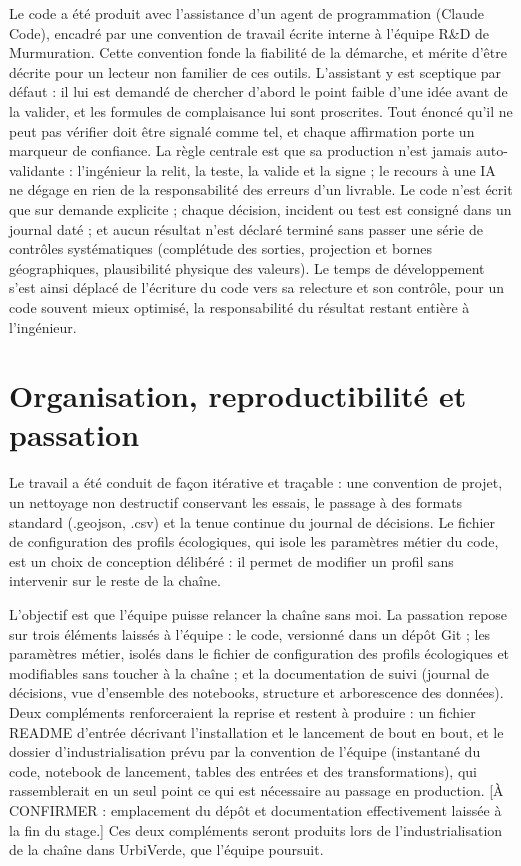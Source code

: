 \documentclass[a4paper,11pt]{report}
\begin{document}
Le code a été produit avec l'assistance d'un agent de programmation (Claude Code), encadré par une convention de travail écrite interne à l'équipe R\&D de Murmuration. Cette convention fonde la fiabilité de la démarche, et mérite d'être décrite pour un lecteur non familier de ces outils. L'assistant y est sceptique par défaut : il lui est demandé de chercher d'abord le point faible d'une idée avant de la valider, et les formules de complaisance lui sont proscrites. Tout énoncé qu'il ne peut pas vérifier doit être signalé comme tel, et chaque affirmation porte un marqueur de confiance. La règle centrale est que sa production n'est jamais auto-validante : l'ingénieur la relit, la teste, la valide et la signe ; le recours à une IA ne dégage en rien de la responsabilité des erreurs d'un livrable. Le code n'est écrit que sur demande explicite ; chaque décision, incident ou test est consigné dans un journal daté ; et aucun résultat n'est déclaré terminé sans passer une série de contrôles systématiques (complétude des sorties, projection et bornes géographiques, plausibilité physique des valeurs). Le temps de développement s'est ainsi déplacé de l'écriture du code vers sa relecture et son contrôle, pour un code souvent mieux optimisé, la responsabilité du résultat restant entière à l'ingénieur.

\section{Organisation, reproductibilité et passation}\label{sec:6.6}

Le travail a été conduit de façon itérative et traçable : une convention de projet, un nettoyage non destructif conservant les essais, le passage à des formats standard (.geojson, .csv) et la tenue continue du journal de décisions. Le fichier de configuration des profils écologiques, qui isole les paramètres métier du code, est un choix de conception délibéré : il permet de modifier un profil sans intervenir sur le reste de la chaîne.

L'objectif est que l'équipe puisse relancer la chaîne sans moi. La passation repose sur trois éléments laissés à l'équipe : le code, versionné dans un dépôt Git ; les paramètres métier, isolés dans le fichier de configuration des profils écologiques et modifiables sans toucher à la chaîne ; et la documentation de suivi (journal de décisions, vue d'ensemble des notebooks, structure et arborescence des données). Deux compléments renforceraient la reprise et restent à produire : un fichier README d'entrée décrivant l'installation et le lancement de bout en bout, et le dossier d'industrialisation prévu par la convention de l'équipe (instantané du code, notebook de lancement, tables des entrées et des transformations), qui rassemblerait en un seul point ce qui est nécessaire au passage en production. [À CONFIRMER : emplacement du dépôt et documentation effectivement laissée à la fin du stage.] Ces deux compléments seront produits lors de l'industrialisation de la chaîne dans UrbiVerde, que l'équipe poursuit.
\end{document}

